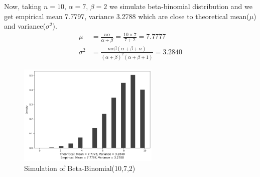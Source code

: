 \begin{example}
    Now, taking $ n=10,\,\alpha=7,\,\beta=2 $ we simulate beta-binomial distribution and we get empirical mean 7.7797, variance 3.2788 which are close to theoretical mean($ \mu $) and variance($ \sigma^2 $).
    \begin{align*}
        \mu &= \frac{n \alpha}{\alpha+\beta} = \frac{10 \times 7 }{ 7 + 2} = 7.7777 \\
        \sigma^2 &= \frac{n \alpha \beta(\alpha+\beta+n)}{(\alpha+\beta)^2(\alpha+\beta+1)} = 3.2840
    \end{align*}
    
    \begin{figure}[H]
        \centering
        \includegraphics[width=0.6\textwidth]{images/gibbs/ex2-beta-binomial.png}
        \caption{Simulation of Beta-Binomial(10,7,2)}
        \label{fig:beta-binomial simulation}
    \end{figure}

\end{example}

